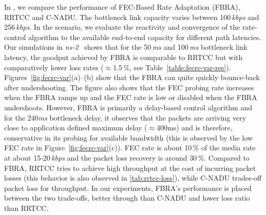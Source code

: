 In , we compare the performance of FEC-Based Rate Adaptation
(FBRA), RRTCC and C-NADU. The bottleneck link capacity varies between
100\,\emph{kbps} and 256\,\emph{kbps}. In the scenario, we evaluate the
reactivity and convergence of the rate-control algorithm to the available 
end-to-end capacity for different path latencies. Our simulations in
\emph{ns-2}~\cite{ns2} shows that for the 50\,\emph{ms} and 100\,\emph{ms}
bottleneck link latency, the goodput achieved by FBRA is comparable to RRTCC
but with comparatively lower loss rates ($\approx$1.5\,\%, see
Table~\ref{table:fecrc-var-res}). Figures~\ref{fig:fecrc-var}(a)--(b) show
that the FBRA can quite quickly bounce-back after undershooting. The figure
also shows that the FEC probing rate increases when the FBRA ramps up and the
FEC rate is low or disabled when the FBRA undershoots. However, FBRA is
primarily a delay-based control algorithm and for the 240\emph{ms} bottleneck
delay, it observes that the packets are arriving very close to application
defined maximum delay ($\approx$400ms) and is therefore, conservative in its
probing for available bandwidth (this is observed by the low FEC rate in
Figure~\ref{fig:fecrc-var}(c)). FEC rate is about 10\,\% of the media rate at
about 15-20\,\emph{kbps} and the packet loss recovery is around 30\,\%.
Compared to FBRA, RRTCC tries to achieve high throughput at the cost of
incurring packet losses (this behavior is also observed in \ref{tab:rrtcc-loss}), 
while C-NADU trades-off packet loss for throughput. In our
experiments, FBRA's performance is placed between the two trade-offs, better
through than C-NADU and lower loss ratio than RRTCC.


